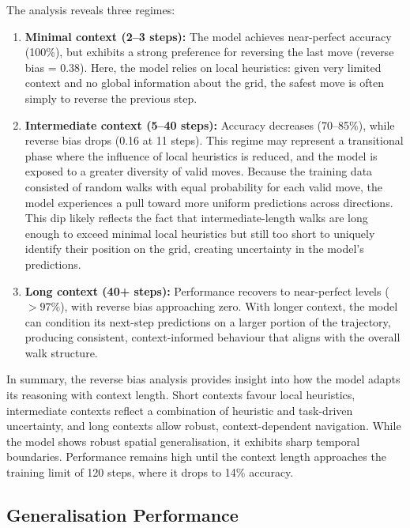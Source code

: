 The analysis reveals three regimes:  

\begin{enumerate}
    \item \textbf{Minimal context (2–3 steps):} The model achieves near-perfect accuracy (100\%), but exhibits a strong preference for reversing the last move (reverse bias = 0.38). Here, the model relies on local heuristics: given very limited context and no global information about the grid, the safest move is often simply to reverse the previous step.

    \item \textbf{Intermediate context (5–40 steps):} Accuracy decreases (70–85\%), while reverse bias drops (0.16 at 11 steps). This regime may represent a transitional phase where the influence of local heuristics is reduced, and the model is exposed to a greater diversity of valid moves. Because the training data consisted of random walks with equal probability for each valid move, the model experiences a pull toward more uniform predictions across directions. This dip likely reflects the fact that intermediate-length walks are long enough to exceed minimal local heuristics but still too short to uniquely identify their position on the grid, creating uncertainty in the model’s predictions.
 

    \item \textbf{Long context (40+ steps):} Performance recovers to near-perfect levels ($>97\%$), with reverse bias approaching zero. With longer context, the model can condition its next-step predictions on a larger portion of the trajectory, producing consistent, context-informed behaviour that aligns with the overall walk structure.  
\end{enumerate}

In summary, the reverse bias analysis provides insight into how the model adapts its reasoning with context length. Short contexts favour local heuristics, intermediate contexts reflect a combination of heuristic and task-driven uncertainty, and long contexts allow robust, context-dependent navigation. While the model shows robust spatial generalisation, it exhibits sharp temporal boundaries. Performance remains high until the context length approaches the training limit of 120 steps, where it drops to 14\% accuracy.

\subsection{Generalisation Performance}

